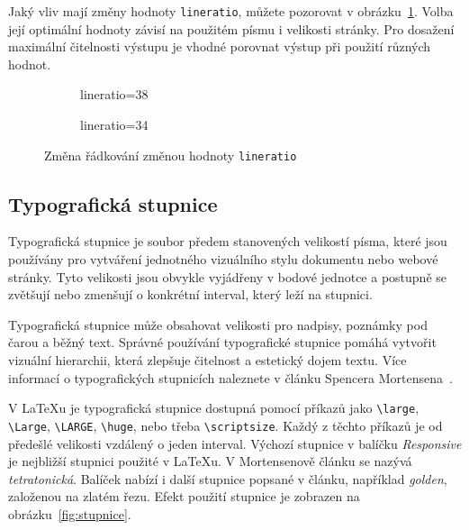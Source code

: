 \documentclass{csbulletin}
\newcommand\balicek[1]{\textit{#1}}
\begin{document}
Jaký vliv mají změny hodnoty \texttt{lineratio}, můžete pozorovat v obrázku~\ref{fig:lineratio}. 
Volba její optimální hodnoty závisí na použitém písmu i velikosti stránky. 
Pro dosažení maximální čitelnosti výstupu je vhodné porovnat výstup 
při použití různých hodnot.



\begin{figure}[tbp]
  \begin{subfigure}[b]{0.45\textwidth}
\caption{lineratio=38}
\end{subfigure}
\begin{subfigure}[b]{0.45\textwidth}
\caption{lineratio=34}
\end{subfigure}
  \caption{Změna řádkování změnou hodnoty \texttt{lineratio}}\label{fig:lineratio}
\end{figure}

\subsection{Typografická stupnice}

Typografická stupnice je soubor předem stanovených velikostí písma, které jsou
používány pro vytváření jednotného vizuálního stylu dokumentu nebo webové
stránky. Tyto velikosti jsou obvykle vyjádřeny v bodové jednotce a postupně se
zvětšují nebo zmenšují o konkrétní interval, který leží na stupnici.

Typografická stupnice může obsahovat velikosti pro nadpisy, poznámky pod čarou a běžný
text. Správné používání typografické stupnice pomáhá vytvořit vizuální
hierarchii, která zlepšuje čitelnost a estetický dojem textu. 
Více informací o typografických stupnicích naleznete v článku Spencera
Mortensena~\cite{mortensen}. 

V \LaTeX u je typografická stupnice dostupná pomocí příkazů jako \verb|\large|,
\verb|\Large|, \verb|\LARGE|, \verb|\huge|, nebo třeba \verb|\scriptsize|.
Každý z těchto příkazů je od předešlé velikosti vzdálený o jeden interval.
Výchozí stupnice v balíčku \balicek{Responsive} je nejbližší stupnici použité
v \LaTeX u.  V Mortensenově článku se nazývá \textit{tetratonická}. Balíček
nabízí i další stupnice popsané v článku, například \textit{golden}, založenou
na zlatém řezu. Efekt použití stupnice je zobrazen na
obrázku~\ref{fig:stupnice}.
\end{document}
